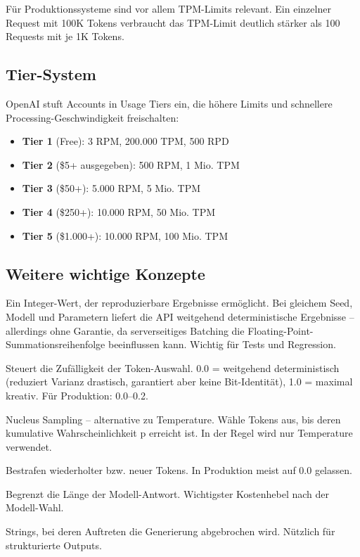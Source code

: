 Für Produktionssysteme sind vor allem TPM-Limits relevant. Ein einzelner Request mit 100K Tokens verbraucht das TPM-Limit deutlich stärker als 100 Requests mit je 1K Tokens.

\subsection{Tier-System}

OpenAI stuft Accounts in Usage Tiers ein, die höhere Limits und schnellere Processing-Geschwindigkeit freischalten:

\begin{itemize}[leftmargin=*]
    \item \textbf{Tier 1} (Free): 3 RPM, 200.000 TPM, 500 RPD
    \item \textbf{Tier 2} (\$5+ ausgegeben): 500 RPM, 1 Mio. TPM
    \item \textbf{Tier 3} (\$50+): 5.000 RPM, 5 Mio. TPM
    \item \textbf{Tier 4} (\$250+): 10.000 RPM, 50 Mio. TPM
    \item \textbf{Tier 5} (\$1.000+): 10.000 RPM, 100 Mio. TPM
\end{itemize}

\subsection{Weitere wichtige Konzepte}

\begin{description}[leftmargin=*,style=nextline]
    \item[Seed] Ein Integer-Wert, der reproduzierbare Ergebnisse ermöglicht. Bei gleichem Seed, Modell und Parametern liefert die API weitgehend deterministische Ergebnisse -- allerdings ohne Garantie, da serverseitiges Batching die Floating-Point-Summationsreihenfolge beeinflussen kann. Wichtig für Tests und Regression.
    \item[Temperature] Steuert die Zufälligkeit der Token-Auswahl. 0.0 = weitgehend deterministisch (reduziert Varianz drastisch, garantiert aber keine Bit-Identität), 1.0 = maximal kreativ. Für Produktion: 0.0--0.2.
    \item[Top-P] Nucleus Sampling -- alternative zu Temperature. Wähle Tokens aus, bis deren kumulative Wahrscheinlichkeit p erreicht ist. In der Regel wird nur Temperature verwendet.
    \item[Frequency/Presence Penalty] Bestrafen wiederholter bzw. neuer Tokens. In Produktion meist auf 0.0 gelassen.
    \item[Max Completion Tokens] Begrenzt die Länge der Modell-Antwort. Wichtigster Kostenhebel nach der Modell-Wahl.
    \item[Stop Sequences] Strings, bei deren Auftreten die Generierung abgebrochen wird. Nützlich für strukturierte Outputs.
\end{description}


